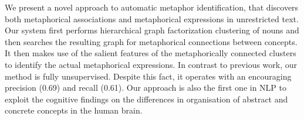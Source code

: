 We present a novel approach to automatic metaphor identification, that discovers both metaphorical associations and metaphorical expressions in
 unrestricted text. Our system first performs hierarchical graph factorization
 clustering of nouns and then searches the resulting graph for metaphorical
 connections between concepts. It then makes use of the salient features of the
 metaphorically connected clusters to identify the actual metaphorical
 expressions. In contrast to previous work, our method is fully unsupervised.
 Despite this fact, it operates with an encouraging precision (0.69) and recall
 (0.61). Our approach is also the first one in NLP to exploit the cognitive
 findings on the differences in organisation of abstract and concrete concepts
 in the human brain.

